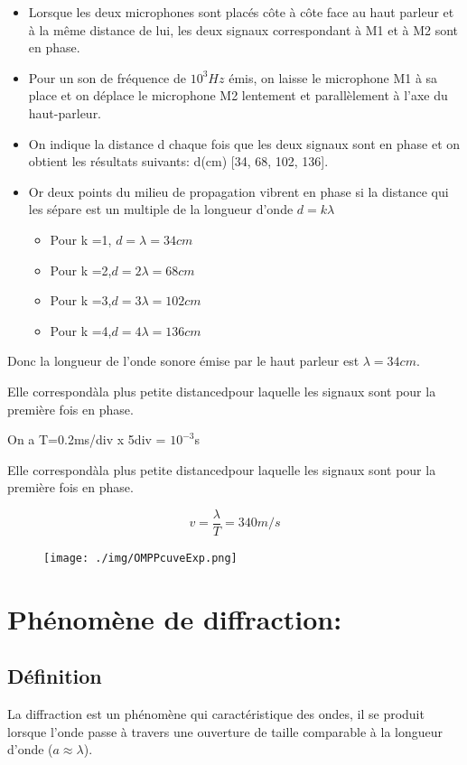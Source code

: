 \documentclass[12pt]{article}
\begin{document}
\begin{itemize}
	\item Lorsque les deux microphones sont placés côte à côte face au haut parleur et à la même distance de lui, les deux signaux correspondant à M1 et à M2 sont en phase.
	\item Pour un son de fréquence de $10^3Hz$ émis, on laisse le microphone M1 à sa place et on déplace le microphone M2 lentement et parallèlement à l'axe du haut-parleur.
	\item On indique la distance d chaque fois que les deux signaux sont en phase et on obtient les résultats suivants: d(cm) [34, 68, 102, 136].
	\item Or deux points du milieu de propagation vibrent en phase si la distance qui les sépare est un multiple de la longueur d'onde $d =k\lambda$ 
		\begin{itemize}
			\item Pour k =1, $d = \lambda = 34cm$
			\item Pour k =2,$d = 2\lambda = 68cm$
			\item Pour k =3,$d = 3\lambda = 102cm$
			\item Pour k =4,$d = 4\lambda = 136cm$
		\end{itemize}
\end{itemize}

Donc la longueur de l'onde sonore émise par le haut parleur est $\lambda=34cm$.

Elle correspondàla plus petite distancedpour laquelle les signaux sont pour la première fois en phase.

On a T=0.2ms/div x 5div = $10^{-3}$s

Elle correspondàla plus petite distancedpour laquelle les signaux sont pour la première fois en phase.

$$v = \frac{\lambda}{T} = 340m/s$$

\begin{figure}
	\vspace{-2cm}
	\texttt{[image: ./img/OMPPcuveExp.png]}
\end{figure}


\section{Phénomène de diffraction: }
\subsection{Définition}
La diffraction est un phénomène qui caractéristique des ondes, il se produit lorsque l'onde passe à travers une ouverture de taille comparable à la longueur d'onde ($a \approx \lambda$).
\end{document}
